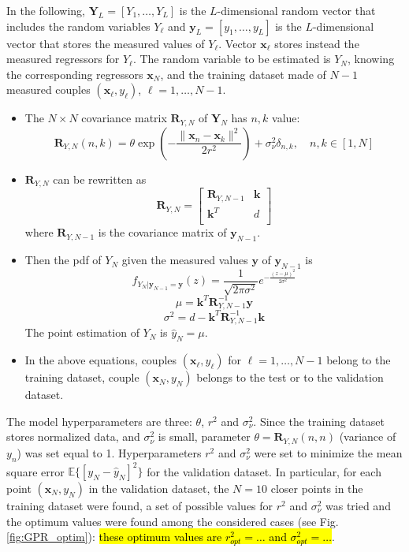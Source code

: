 \documentclass[12pt]{article}
\begin{document}
In the following, $\mathbf{Y}_L=[Y_1,\ldots,Y_L]$ is the $L$-dimensional random vector that includes the random variables $Y_\ell$ and $\mathbf{y}_{L}=[y_1,\ldots,y_{L}]$ is the $L$-dimensional vector that stores the measured values of $Y_\ell$. Vector $\mathbf{x}_\ell$ stores instead the measured regressors for $Y_\ell$. The random variable to be estimated is $Y_N$, knowing the corresponding regressors $\mathbf{x}_N$, and the training dataset made of $N-1$ measured couples $(\mathbf{x}_\ell,y_\ell)$, $\ell=1,\ldots,N-1$.
\begin{itemize}
\item The $N \times N$ covariance matrix $\mathbf{R}_{Y,N}$ of $\mathbf{Y}_N$ has $n,k$ value:
\[ \mathbf{R}_{Y,N}(n,k)=\theta \exp\left(-\frac{\|\mathbf{x}_n-\mathbf{x}_k\|^2}{2 r^2}\right)+\sigma_\nu^2\delta_{n,k},\quad n,k \in [1,N]\]
\item $\mathbf{R}_{Y,N}$ can be rewritten as
\[ \mathbf{R}_{Y,N}=
\begin{bmatrix}
\mathbf{R}_{Y,N-1} & \mathbf{k}\\
\mathbf{k}^T & d\\
\end{bmatrix}
\]
where $\mathbf{R}_{Y,N-1}$ is the covariance matrix of $\mathbf{y}_{N-1}$.
\item Then the pdf of $Y_N$ given the measured values $\mathbf{y}$ of $\mathbf{y}_{N-1}$ is
\[ f_{Y_N|\mathbf{y}_{N-1}=\mathbf{y}}(z)=\frac{1}{\sqrt{2\pi \sigma^2}}e^{-\frac{(z-\mu)^2}{2\sigma^2}}\]
\begin{equation} \mu=\mathbf{k}^T \mathbf{R}_{Y,N-1}^{-1}\mathbf{y}
\label{eq:mu}
\end{equation}
\begin{equation} \sigma^2=d-\mathbf{k}^T \mathbf{R}_{Y,N-1}^{-1}\mathbf{k}
\label{eq:sigma}
\end{equation}
The point estimation of $Y_N$ is $\hat{y}_N=\mu$.
\item In the above equations, couples $(\mathbf{x}_\ell,y_\ell)$ for $\ell=1,\ldots, N-1$ belong to the training dataset, couple $(\mathbf{x}_N,y_N)$ belongs to the test or to the validation dataset. 
\end{itemize}

The model hyperparameters are three: $\theta$, $r^2$ and $\sigma_\nu^2$. Since the training dataset stores normalized data, and $\sigma^2_\nu$ is small, parameter $\theta=\mathbf{R}_{Y,N}(n,n)$ (variance of $y_n$) was set equal to 1. 
Hyperparameters $r^2$ and $\sigma_\nu^2$ were set to minimize the mean square error $\mathbb{E}\{[y_N-\hat{y}_N]^2\}$ for the validation dataset. In particular, for each point $(\mathbf{x}_N,y_N)$ in the validation dataset, the $N=10$ closer points in the training dataset were found, a set of possible values for $r^2$ and $\sigma_\nu^2$ was tried and the optimum values were found among the considered cases (see Fig. \ref{fig:GPR_optim}): \hl{these optimum values are $r^2_{opt}=\ldots$ and  $\sigma^2_{opt}=\ldots$}.
\end{document}

